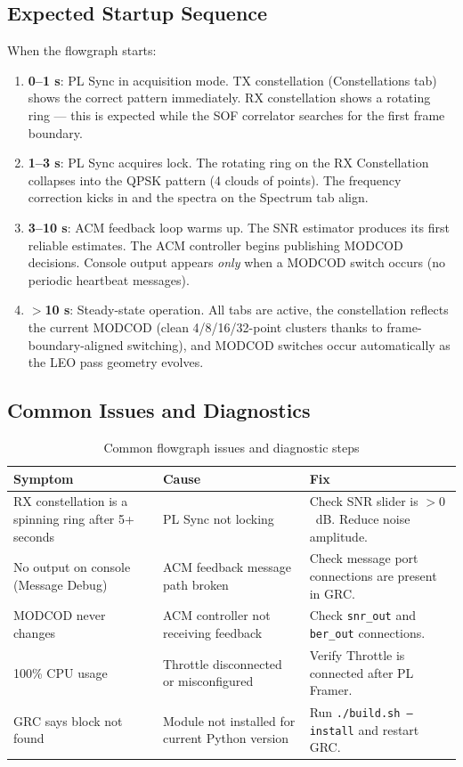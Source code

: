 \documentclass[12pt,a4paper]{report}
\begin{document}
\subsection{Expected Startup Sequence}

When the flowgraph starts:
\begin{enumerate}
    \item \textbf{0--1 s}: PL Sync in acquisition mode. TX constellation
          (Constellations tab) shows the correct pattern immediately. RX
          constellation shows a rotating ring --- this is expected while the
          SOF correlator searches for the first frame boundary.
    \item \textbf{1--3 s}: PL Sync acquires lock. The rotating ring on the RX
          Constellation collapses into the QPSK pattern (4 clouds of points).
          The frequency correction kicks in and the spectra on the Spectrum tab
          align.
    \item \textbf{3--10 s}: ACM feedback loop warms up. The SNR estimator
          produces its first reliable estimates. The ACM controller begins
          publishing MODCOD decisions. Console output appears \emph{only}
          when a MODCOD switch occurs (no periodic heartbeat messages).
    \item \textbf{$>$10 s}: Steady-state operation. All tabs are active, the
          constellation reflects the current MODCOD (clean 4/8/16/32-point
          clusters thanks to frame-boundary-aligned switching), and MODCOD
          switches occur automatically as the LEO pass geometry evolves.
\end{enumerate}

\subsection{Common Issues and Diagnostics}

\begin{table}[H]
\centering
\caption{Common flowgraph issues and diagnostic steps}
\label{tab:diag}
\begin{tabular}{p{3.5cm}p{4cm}p{5cm}}
\toprule
\textbf{Symptom} & \textbf{Cause} & \textbf{Fix} \\
\midrule
RX constellation is a spinning ring after 5+ seconds
  & PL Sync not locking
  & Check SNR slider is $> 0$~dB. Reduce noise amplitude. \\
No output on console (Message Debug)
  & ACM feedback message path broken
  & Check message port connections are present in GRC. \\
MODCOD never changes
  & ACM controller not receiving feedback
  & Check \texttt{snr\_out} and \texttt{ber\_out} connections. \\
100\% CPU usage
  & Throttle disconnected or misconfigured
  & Verify Throttle is connected after PL Framer. \\
GRC says block not found
  & Module not installed for current Python version
  & Run \texttt{./build.sh --install} and restart GRC. \\
\bottomrule
\end{tabular}
\end{table}
\end{document}
